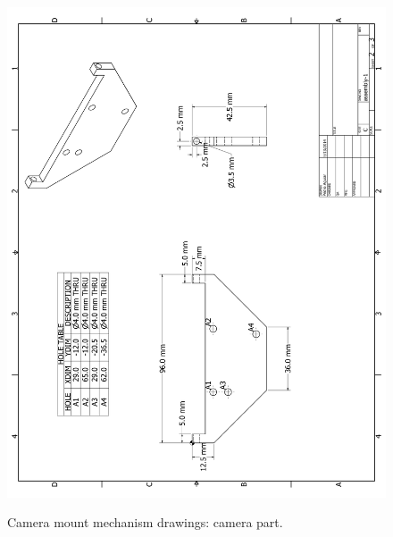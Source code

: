\begin{figure}[ht!]
\begin{center}
\includegraphics[height=1.2\textwidth]{fig/cammountp2}\\
\caption[Drawing. Camera part.]{Camera mount mechanism drawings: camera part.}
\label{fig_cammountp2}
\end{center}
\end{figure}
